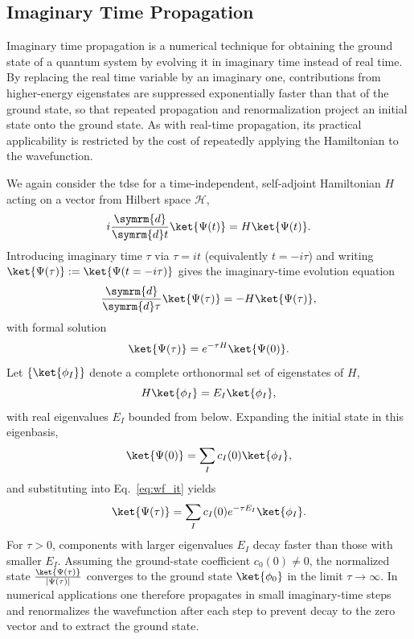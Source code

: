 \subsection{Imaginary Time Propagation}\label{sec:imaginary_time_propagation}
Imaginary time propagation is a numerical technique for obtaining the ground state of a
quantum system by evolving it in imaginary time instead of real time. By replacing the real
time variable by an imaginary one, contributions from higher-energy eigenstates are
suppressed exponentially faster than that of the ground state, so that repeated
propagation and renormalization project an initial state onto the ground state. As with real-time propagation, its practical applicability is restricted by the cost of repeatedly applying the Hamiltonian to the wavefunction.

We again consider the \acrshort{tdse} for a time-independent, self-adjoint Hamiltonian
$H$ acting on a vector from Hilbert space $\mathcal{H}$,
\begin{equation}\label{eq:tdse_it_real}
i\frac{\symrm{d}}{\symrm{d}t}\ket{\Psi(t)}=H\ket{\Psi(t)}.
\end{equation}
Introducing imaginary time $\tau$ via $\tau = i t$ (equivalently $t=-i\tau$) and writing
$\ket{\Psi(\tau)}:=\ket{\Psi(t=-i\tau)}$ gives the imaginary-time evolution equation
\begin{equation}\label{eq:tdse_it}
\frac{\symrm{d}}{\symrm{d}\tau}\ket{\Psi(\tau)}=-H\ket{\Psi(\tau)},
\end{equation}
with formal solution
\begin{equation}\label{eq:wf_it}
\ket{\Psi(\tau)}=e^{-\tau H}\ket{\Psi(0)}.
\end{equation}
Let $\{\ket{\phi_I}\}$ denote a complete orthonormal set of eigenstates of $H$,
\begin{equation}
H\ket{\phi_I}=E_I\ket{\phi_I},
\end{equation}
with real eigenvalues $E_I$ bounded from below. Expanding the initial state in this eigenbasis,
\begin{equation}\label{eq:wf_expansion_eigenstates}
\ket{\Psi(0)}=\sum_I c_I(0)\ket{\phi_I},
\end{equation}
and substituting into Eq.~\eqref{eq:wf_it} yields
\begin{equation}\label{eq:tdse_it_expansion}
\ket{\Psi(\tau)}=\sum_I c_I(0)e^{-\tau E_I}\ket{\phi_I}.
\end{equation}
For $\tau>0$, components with larger eigenvalues $E_I$ decay faster than those with
smaller $E_I$. Assuming the ground-state coefficient $c_0(0)\neq 0$, the normalized state
$\frac{\ket{\Psi(\tau)}}{\lvert\Psi(\tau)\rvert}$ converges to the ground state $\ket{\phi_0}$ in the limit
$\tau\to\infty$. In numerical applications one therefore propagates in small imaginary-time
steps and renormalizes the wavefunction after each step to prevent decay to the zero
vector and to extract the ground state.

